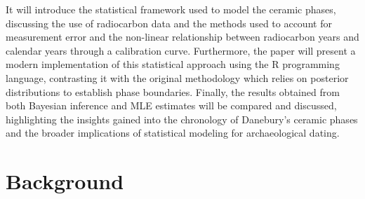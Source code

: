\documentclass{article}
\begin{document}
It will introduce the statistical framework used to model the ceramic phases, discussing the use of radiocarbon data and the methods used to account for measurement error and the non-linear relationship between radiocarbon years and calendar years through a calibration curve. Furthermore, the paper will present a modern implementation of this statistical approach using the R programming language, contrasting it with the original methodology which relies on posterior distributions to establish phase boundaries. Finally, the results obtained from both Bayesian inference and MLE estimates will be compared and discussed, highlighting the insights gained into the chronology of Danebury's ceramic phases and the broader implications of statistical modeling for archaeological dating.

\section{Background}
\end{document}
